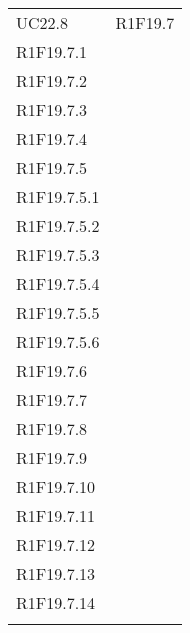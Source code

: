 \begin{longtable}{ >{\centering}p{}
		>{\centering}p{}}
	UC22.8 & R1F19.7\\
	R1F19.7.1 \\R1F19.7.2 \\R1F19.7.3 \\R1F19.7.4 \\R1F19.7.5 \\R1F19.7.5.1 \\R1F19.7.5.2 \\R1F19.7.5.3 \\R1F19.7.5.4 \\R1F19.7.5.5 \\R1F19.7.5.6 \\R1F19.7.6 \\R1F19.7.7 \\R1F19.7.8 \\R1F19.7.9 \\R1F19.7.10 \\R1F19.7.11 \\R1F19.7.12 \\R1F19.7.13 \\R1F19.7.14 \\\tabularnewline
	
\end{longtable}
